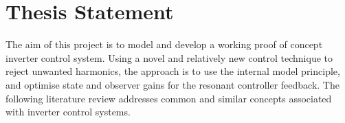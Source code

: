 \chapter{Thesis Statement}

The aim of this project is to model and develop a working proof of concept inverter control system. Using a novel and relatively new control technique to reject unwanted harmonics, the approach is to use the internal model principle, and optimise state and observer gains for the resonant controller feedback. The following literature review addresses common and similar concepts associated with inverter control systems.\\